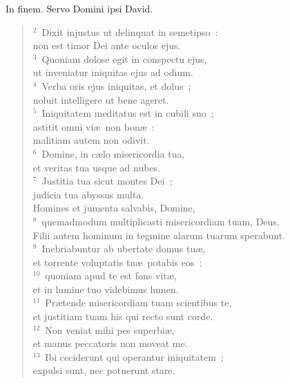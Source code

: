 \lettrine[lines=3,image=true,loversize=0.05,lraise=-0.03]{I}{}n finem. Servo Domini ipsi David.
\begin{flushleft}\begin{verse}\vspace{6pt}${}^{2}$~Dixit injustus ut delinquat in semetipso~:\\ non est timor Dei ante oculos ejus.\\
${}^{3}$~Quoniam dolose egit in conspectu ejus,\\ ut inveniatur iniquitas ejus ad odium.\\
${}^{4}$~Verba oris ejus iniquitas, et dolus~;\\ noluit intelligere ut bene ageret.\\
${}^{5}$~Iniquitatem meditatus est in cubili suo~;\\ astitit omni vi\ae\ non bon\ae~:\\ malitiam autem non odivit.\\
${}^{6}$~Domine, in c\ae lo misericordia tua,\\ et veritas tua usque ad nubes.\\
${}^{7}$~Justitia tua sicut montes Dei~;\\ judicia tua abyssus multa.\\ Homines et jumenta salvabis, Domine,\\
${}^{8}$~quemadmodum multiplicasti misericordiam tuam, Deus.\\ Filii autem hominum in tegmine alarum tuarum sperabunt.\\
${}^{9}$~Inebriabuntur ab ubertate domus tu\ae ,\\ et torrente voluptatis tu\ae\ potabis eos~:\\
${}^{10}$~quoniam apud te est fons vit\ae ,\\ et in lumine tuo videbimus lumen.\\
${}^{11}$~Pr\ae tende misericordiam tuam scientibus te,\\ et justitiam tuam his qui recto sunt corde.\\
${}^{12}$~Non veniat mihi pes superbi\ae ,\\ et manus peccatoris non moveat me.\\
${}^{13}$~Ibi ceciderunt qui operantur iniquitatem~;\\ expulsi sunt, nec potuerunt stare.\end{verse}\end{flushleft}




